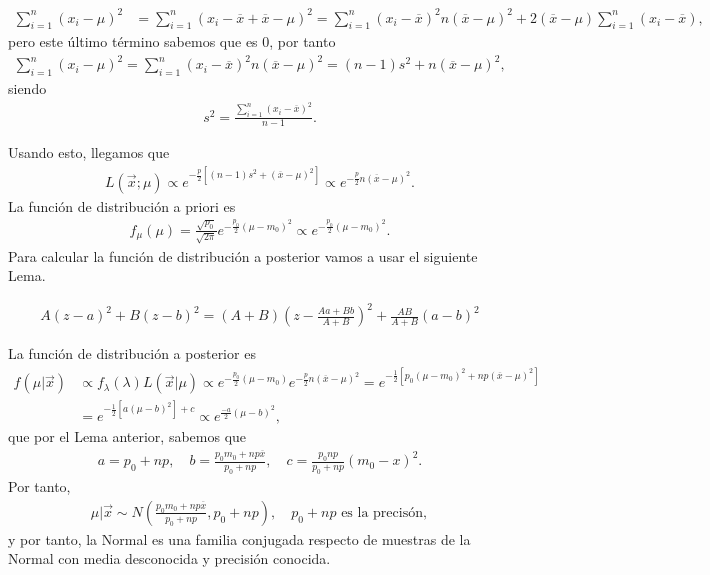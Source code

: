 \begin{obs}
    \begin{align*}
        \sum_{i=1}^{n} (x_i - \mu)^2 & = \sum_{i=1}^{n} (x_i - \overline{x} + \overline{x} - \mu)^2 = \sum_{i=1}^{n} (x_i - \overline{x})^2 n(\overline{x} - \mu)^2 + 2(\overline{x} - \mu)\sum_{i=1}^{n} (x_i - \overline{x}),
    \end{align*}
    pero este último término sabemos que es 0, por tanto
    \begin{align*}
        \sum_{i=1}^{n} (x_i - \mu)^2 = \sum_{i=1}^{n} (x_i - \overline{x})^2 n(\overline{x} - \mu)^2 = (n-1)s^2 + n(\overline{x} - \mu)^2,
    \end{align*}
    siendo
    \begin{align*}
        s^2 = \frac{\sum_{i=1}^{n} (x_i - \overline{x})^2}{n-1}.
    \end{align*}
\end{obs}
Usando esto, llegamos que
\begin{align*}
    L(\vec{x};\mu) \propto e^{-\frac{p}{2}[(n-1)s^2 + (\overline{x} - \mu)^2]} \propto e^{-\frac{p}{2}n(\overline{x} - \mu)^2}.
\end{align*}
La función de distribución a priori es
\begin{align*}
    f_{\mu}(\mu) = \frac{\sqrt{p_0}}{\sqrt{2\pi}} e^{-\frac{p_0}{2}(\mu-m_0)^2} \propto e^{-\frac{p_0}{2}(\mu-m_0)^2}.
\end{align*}
Para calcular la función de distribución a posterior vamos a usar el siguiente Lema.
\begin{lema}
    \begin{align*}
        A(z-a)^2 + B(z-b)^2 = (A+B)\left( z - \frac{Aa + Bb}{A+B} \right)^2 + \frac{AB}{A+B}(a-b)^2
    \end{align*}
\end{lema}
La función de distribución a posterior es
\begin{align*}
    f(\mu | \vec{x}) & \propto f_{\lambda}(\lambda) L(\vec{x} | \mu) \propto e^{-\frac{p_0}{2}(\mu - m_0)} e^{-\frac{p}{2}n(\overline{x} - \mu)^2} = e^{-\frac{1}{2}[p_0(\mu-m_0)^2 + np(\overline{x} - \mu)^2]} \\
                     & = e^{-\frac{1}{2}[a(\mu - b)^2] + c} \propto e^{\frac{-a}{2}(\mu - b)^2},
\end{align*}
que por el Lema anterior, sabemos que
\begin{align*}
    a = p_0 + np, \quad b = \frac{p_0m_0 + np\overline{x}}{p_0 + np}, \quad c = \frac{p_0np}{p_0 + np}(m_0 - x)^2.
\end{align*}
Por tanto,
\begin{align*}
    \mu | \vec{x} \sim N\left(\frac{p_0m_0 + np\overline{x}}{p_0 + np}, p_0 + np\right), \quad p_0 + np \text{ es la precisón},
\end{align*}
y por tanto, la Normal es una familia conjugada respecto de muestras de la Normal con media desconocida y precisión conocida.

